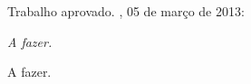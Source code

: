 \documentclass[12pt,oneside,a4paper,english,french,spanish]{abntex2}
\begin{document}

%
% 
%
\begin{folhadeaprovacao}

  \begin{center}
    {\ABNTEXchapterfont\large\imprimirautor}

    \vspace*{\fill}\vspace*{\fill}
    {\ABNTEXchapterfont\bfseries\Large\imprimirtitulo}
    \vspace*{\fill}
    
    \hspace{.45\textwidth}
    \begin{minipage}{.5\textwidth}
        \imprimirpreambulo
    \end{minipage}%
    \vspace*{\fill}
  \end{center}
    
  Trabalho aprovado. \imprimirlocal, 05 de março de 2013:

      
  \begin{center}
    \vspace*{0.5cm}
    {\large\imprimirlocal}
    \par
    {\large\imprimirdata}
    \vspace*{1cm}
  \end{center}
  
\end{folhadeaprovacao}

\begin{dedicatoria}
    \vspace*{\fill}
    \centering
    \noindent
    \textit{A fazer.} \vspace*{\fill}
\end{dedicatoria}

\begin{agradecimentos}
  A fazer.
\end{agradecimentos}
\end{document}
